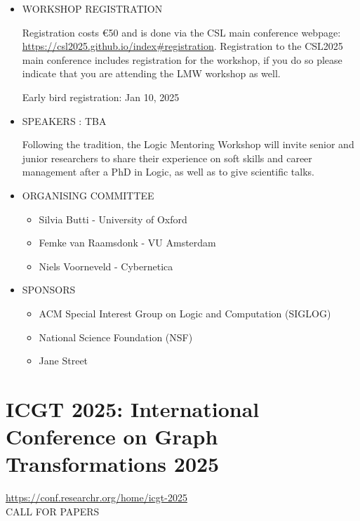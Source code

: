\documentclass[prodmode,acmtecs]{acmsmall} %
\begin{document}
\begin{itemize}\item  WORKSHOP REGISTRATION 
 
  Registration costs €50 and is done via the CSL main conference webpage: \href{https://csl2025.github.io/index#registration}{https://csl2025.github.io/index\#registration}. Registration to the CSL2025 main conference includes registration for the workshop, if you do so please indicate that you are attending the LMW workshop as well.  
 
Early bird registration: Jan 10, 2025 
 
\item  SPEAKERS : TBA 
 
  Following the tradition, the Logic Mentoring Workshop will invite senior and junior researchers to share their experience on soft skills and career management after a PhD in Logic, as well as to give scientific talks. 
 
\item  ORGANISING COMMITTEE 
 
\begin{itemize}\item  Silvia Butti - University of Oxford
\item  Femke van Raamsdonk - VU Amsterdam
\item  Niels Voorneveld - Cybernetica
\end{itemize} 
\item  SPONSORS 
 
\begin{itemize}\item  ACM Special Interest Group on Logic and Computation (SIGLOG)
\item  National Science Foundation (NSF)
\item  Jane Street
\end{itemize} 
\end{itemize}\section{ICGT 2025: International Conference on Graph Transformations 2025}\label{ICGT2025}  \href{https://conf.researchr.org/home/icgt-2025}{https://conf.researchr.org/home/icgt-2025}\\ 
CALL FOR PAPERS  
\end{document}
